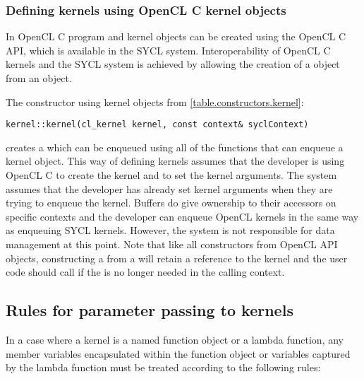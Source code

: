 

\subsubsection{Defining kernels using OpenCL C kernel objects}
\label{sec:interfaces.kernels.opencl.objects}

In OpenCL C \cite{opencl12} program and kernel objects can be created
using the OpenCL C API, which is available in the SYCL
system. Interoperability of OpenCL C kernels and the SYCL system is
achieved by allowing the creation of a  object from
an  object.

The constructor using kernel objects from \ref{table.constructors.kernel}:
\begin{lstlisting}[style=nonumbers]
kernel::kernel(cl_kernel kernel, const context& syclContext)
\end{lstlisting}

creates a  which can be enqueued using
all of the  functions that can enqueue a kernel object.
This way of defining kernels assumes that
the developer is using OpenCL C to create the kernel and to set the
kernel arguments. The system assumes that the developer has already
set kernel arguments when they are trying to enqueue the
kernel. Buffers do give ownership to their accessors on specific
contexts and the developer can enqueue OpenCL kernels in the same way
as enqueuing SYCL kernels.  However, the system is not responsible for
data management at this point.  Note that like all constructors from
OpenCL API objects, constructing a  from
a  will retain a reference to the kernel and the
user code should call  if the
 is no longer needed in the calling context.


\subsection{Rules for parameter passing to kernels}
\label{sec:kernel.parameter.passing}
In a case where a kernel is a named function object or a lambda function, any
member variables encapsulated within the function object or variables captured by
the lambda function must be treated according to the following rules:

